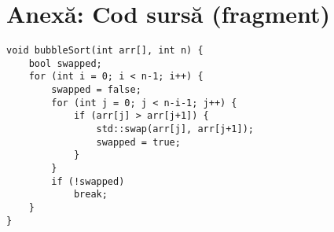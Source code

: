 \documentclass[12pt]{article}
\begin{document}
\section*{Anexă: Cod sursă (fragment)}

\begin{verbatim}
void bubbleSort(int arr[], int n) {
    bool swapped;
    for (int i = 0; i < n-1; i++) {
        swapped = false;
        for (int j = 0; j < n-i-1; j++) {
            if (arr[j] > arr[j+1]) {
                std::swap(arr[j], arr[j+1]);
                swapped = true;
            }
        }
        if (!swapped)
            break;
    }
}
\end{verbatim}
\end{document}
